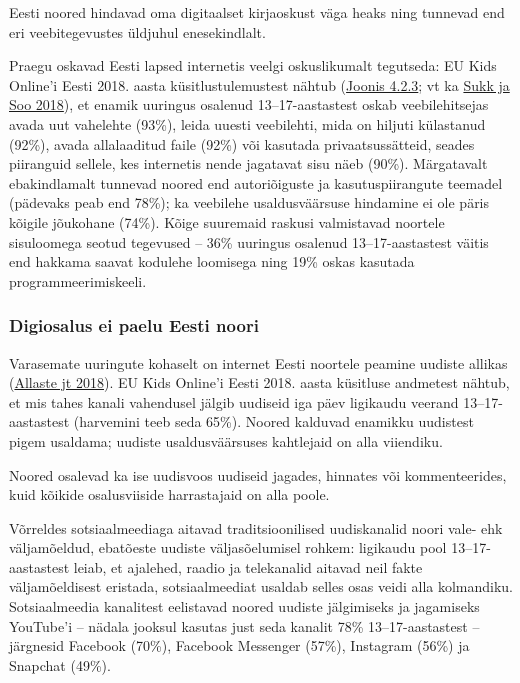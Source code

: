 \documentclass[estonian,]{article}
\begin{document}
\begin{blockquote-left}
Eesti noored hindavad oma digitaalset kirjaoskust väga heaks ning
tunnevad end eri veebitegevustes üldjuhul enesekindlalt.
\end{blockquote-left}

Praegu oskavad Eesti lapsed internetis veelgi oskuslikumalt tegutseda: EU Kids Online'i Eesti 2018. aasta küsitlustulemustest nähtub (\protect\hyperlink{figure423}{Joonis 4.2.3}; vt ka \protect\hyperlink{Sukk-Soo2018}{Sukk ja Soo 2018}), et enamik uuringus osalenud 13--17-aastastest oskab veebilehitsejas avada uut vahelehte (93\%), leida uuesti veebilehti, mida on hiljuti külastanud (92\%), avada allalaaditud faile (92\%) või kasutada privaatsussätteid, seades piiranguid sellele, kes internetis nende jagatavat sisu näeb (90\%). Märgatavalt ebakindlamalt tunnevad noored end autoriõiguste ja kasutuspiirangute teemadel (pädevaks peab end 78\%); ka veebilehe usaldusväärsuse hindamine ei ole päris kõigile jõukohane (74\%). Kõige suuremaid raskusi valmistavad noortele sisuloomega seotud tegevused -- 36\% uuringus osalenud 13--17-aastastest väitis end hakkama saavat kodulehe loomisega ning 19\% oskas kasutada programmeerimiskeeli.

\hypertarget{digiosalus-ei-paelu-eesti-noori}{%
\subsubsection*{Digiosalus ei paelu Eesti noori}\label{digiosalus-ei-paelu-eesti-noori}}

Varasemate uuringute kohaselt on internet Eesti noortele peamine uudiste allikas (\protect\hyperlink{Allaste2018}{Allaste jt 2018}). EU Kids Online'i Eesti 2018. aasta küsitluse andmetest nähtub, et mis tahes kanali vahendusel jälgib uudiseid iga päev ligikaudu veerand 13--17-aastastest (harvemini teeb seda 65\%). Noored kalduvad enamikku uudistest pigem usaldama; uudiste usaldusväärsuses kahtlejaid on alla viiendiku.

\begin{blockquote-left}
Noored osalevad ka ise uudisvoos uudiseid jagades, hinnates või
kommenteerides, kuid kõikide osalusviiside harrastajaid on alla poole.
\end{blockquote-left}

Võrreldes sotsiaalmeediaga aitavad traditsioonilised uudiskanalid noori vale- ehk väljamõeldud, ebatõeste uudiste väljasõelumisel rohkem: ligikaudu pool 13--17-aastastest leiab, et ajalehed, raadio ja telekanalid aitavad neil fakte väljamõeldisest eristada, sotsiaalmeediat usaldab selles osas veidi alla kolmandiku. Sotsiaalmeedia kanalitest eelistavad noored uudiste jälgimiseks ja jagamiseks YouTube'i -- nädala jooksul kasutas just seda kanalit 78\% 13--17-aastastest -- järgnesid Facebook (70\%), Facebook Messenger (57\%), Instagram (56\%) ja Snapchat (49\%).
\end{document}
